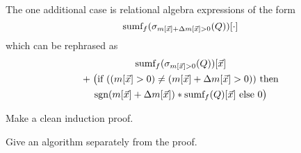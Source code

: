 The one additional case is relational algebra expressions of the form
\[
\mbox{sumf}_f(\sigma_{m[\vec{x}] + \Delta m[\vec{x}] > 0}(Q))[\cdot]
\]
which can be rephrased as
\begin{multline*}
\mbox{sumf}_f(\sigma_{m[\vec{x}] > 0}(Q))[\vec{x}]
\\
+ \;
\big( \mbox{if ($(m[\vec{x}] > 0) \neq (m[\vec{x}] + \Delta m[\vec{x}] > 0))$ then}
\\
      \mbox{$\mbox{sgn}(m[\vec{x}] + \Delta m[\vec{x}]) *
      \mbox{sumf}_f(Q)[\vec{x}]$ else 0} \big)
\end{multline*}
\punto



\begin{todo}
Make a clean induction proof.

Give an algorithm separately from the proof.
\end{todo}



